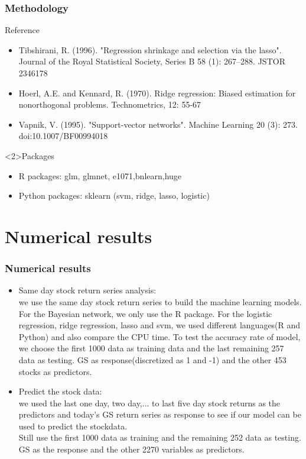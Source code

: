 \documentclass[xcolor={x11names,svgnames,dvipsnames}]{beamer}
\begin{document}
\begin{frame}
\frametitle{Methodology }
  \begin{block}{Reference}
   \begin{itemize}
        \item  Tibshirani, R. (1996). "Regression shrinkage and selection via the lasso". Journal of the Royal Statistical Society, Series B 58 (1): 267–288. JSTOR 2346178
        \item Hoerl, A.E. and Kennard, R. (1970). Ridge regression: Biased
estimation for nonorthogonal problems. Technometrics, 12:
55-67
        \item Vapnik, V. (1995). "Support-vector networks". Machine Learning 20 (3): 273. doi:10.1007/BF00994018
    \end{itemize}
  \end{block}

  \begin{block}<2>{Packages}
    \begin{itemize}
        \item  R packages: glm, glmnet, e1071,bnlearn,huge
        \item  Python packages: sklearn (svm, ridge, lasso, logistic)
    \end{itemize}
  \end{block}

\end{frame}


\section{Numerical results}

\begin{frame}
\frametitle{Numerical results}
\begin{itemize}
        \item  Same day stock return series analysis:\\
        we use the same day stock return series to build the machine learning models. For the Bayesian network, we only use the R package. For the  logistic regression, ridge regression, lasso and svm, we used different languages(R and Python) and also compare the CPU time.
        To test the accuracy rate of model, we choose the first 1000 data as training data and the last remaining 257 data as testing. GS as response(discretized as 1 and -1) and the other 453 stocks as predictors.\\
        \item  Predict the stock data:\\
        we used the last one day, two day,... to last five day stock returns as the predictors and today's GS return series as response to see if our model can be used to predict the stockdata.\\
        Still use the first 1000 data as training and the remaining 252 data as testing. GS as the response and the other 2270 variables as predictors.\\
    \end{itemize}

\end{frame}
\end{document}
